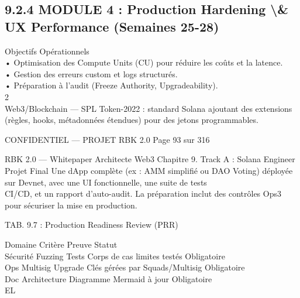 \subsection{9.2.4 MODULE 4 : Production Hardening \textbackslash{}& UX Performance (Semaines 25-28)}
Objectifs Opérationnels\\
\vspace{0.5em}
• Optimisation des Compute Units (CU) pour réduire les coûts et la latence.\\
\vspace{0.5em}
• Gestion des erreurs custom et logs structurés.\\
\vspace{0.5em}
• Préparation à l’audit (Freeze Authority, Upgradeability).\\
2\\
Web3/Blockchain — SPL Token-2022 : standard Solana ajoutant des extensions (règles, hooks, métadonnées étendues) pour des jetons programmables.\\
\vspace{0.5em}
\vspace{0.5em}
\vspace{0.5em}
\vspace{0.5em}
\begin{confidential}CONFIDENTIEL — PROJET RBK 2.0                                          Page 93 sur 316\end{confidential}
RBK 2.0 — Whitepaper Architecte Web3                                                                                          Chapitre 9. Track A : Solana Engineer\\
\vspace{0.5em}
\vspace{0.5em}
Projet Final Une dApp complète (ex : AMM simplifié ou DAO Voting) déployée sur Devnet, avec une UI fonctionnelle, une suite de tests\\
CI/CD, et un rapport d’auto-audit. La préparation inclut des contrôles Ops3 pour sécuriser la mise en production.\\
\vspace{0.5em}
\begin{center}\begin{tabular}TAB. 9.7 : Production Readiness Review (PRR)\end{tabular}\end{center}
\vspace{0.5em}
\vspace{0.5em}
Domaine Critère           Preuve                          Statut\\
Sécurité Fuzzing Tests    Corps de cas limites testés     Obligatoire\\
Ops      Multisig Upgrade Clés gérées par Squads/Multisig Obligatoire\\
Doc      Architecture     Diagramme Mermaid à jour        Obligatoire\\
\vspace{0.5em}
\vspace{0.5em}
\vspace{0.5em}
\vspace{0.5em}
EL\\
